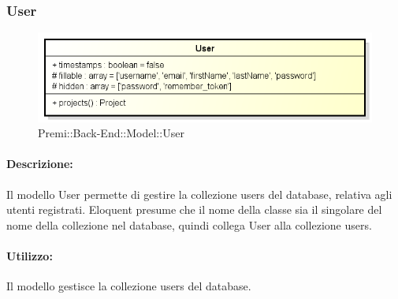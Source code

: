 \subsubsection{User}

	\begin{figure}[h]
		\centering
		\includegraphics[width=0.8\linewidth]{img/back_end_user_model}
		\caption[Premi::Back-End::Model::User]{Premi::Back-End::Model::User}
		\label{fig:back_end_user_model}
	\end{figure}


	\paragraph{Descrizione:}
	Il modello User permette di gestire la collezione users del \gls{database}, relativa agli utenti registrati. Eloquent presume che il nome della classe sia il singolare del nome della collezione nel \gls{database}, quindi collega User alla collezione users.

	\paragraph{Utilizzo:}
	Il modello gestisce la collezione users del \gls{database}.
	
